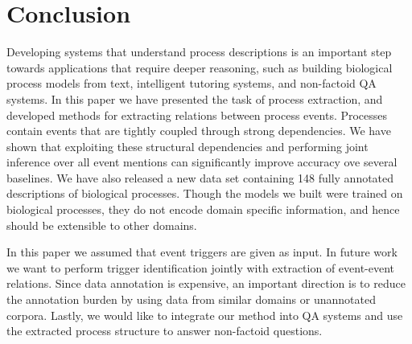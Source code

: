 \section{Conclusion}

Developing systems that understand process descriptions is an important step towards applications that require deeper reasoning, such as building biological process models from text, intelligent tutoring systems, and non-factoid QA systems. In this paper we have presented the task of process extraction, and developed methods for extracting relations between process events. Processes contain events that are  tightly coupled through strong dependencies. We have shown that  exploiting these structural dependencies and performing joint inference over all event mentions can significantly improve accuracy ove several baselines. We have also released a new data set containing 148 fully annotated descriptions of biological processes. Though the models we built were trained on biological processes, they do not encode domain specific information, and hence should be extensible to other domains.

In this paper we assumed that event triggers are given as input. In future work we want to perform trigger identification jointly with extraction of event-event relations. Since data annotation is expensive, an important direction is to reduce the annotation burden by using data from similar domains or unannotated corpora. Lastly, we would like to integrate our method into QA systems and use the extracted process structure to answer non-factoid questions. 
